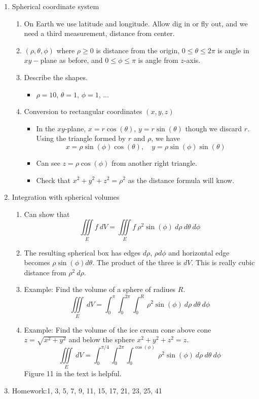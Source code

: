 \documentclass{article}
\begin{document}
\begin{enumerate}
\item Spherical coordinate system
\begin{enumerate}
\item On Earth we use latitude and longitude. Allow dig in or fly out, and we need a third measurement, distance from center.
\item $(\rho, \theta, \phi)$ where $\rho \geq 0$ is distance from the origin, $0 \leq \theta \leq 2\pi$ is angle in $xy-$plane as before, and $0 \leq \phi \leq \pi$ is angle from $z$-axis.
\item Describe the shapes.
\begin{itemize}
\item $\rho = 10$, $\theta = 1$, $\phi = 1$, ...
\end{itemize}
\item Conversion to rectangular coordinates $(x,y,z)$
\begin{itemize}
\item In the $xy$-plane, $x=r\cos(\theta)$, $y=r\sin(\theta)$ though we discard $r$. Using the triangle formed by $r$ and $\rho$, we have
\[
x = \rho \sin(\phi) \cos(\theta), \quad y = \rho \sin(\phi) \sin(\theta)
\]
\item Can see $z = \rho \cos(\phi)$ from another right triangle.
\item Check that $x^2+y^2+z^2 = \rho^2$ as the distance formula will know.
\end{itemize}
\end{enumerate}

\item Integration with spherical volumes
\begin{enumerate}
\item Can show that
\[
\iiint\limits_E f ~dV = \iiint\limits_E f ~\rho^2 \sin(\phi) ~d\rho ~d\theta ~d\phi
\]
\item The resulting spherical box has edges $d\rho$, $\rho d\phi$ and horizontal edge becomes $\rho \sin(\phi) d\theta$. The product of the three is $dV$. This is really cubic distance from $\rho^2 ~d\rho$.
\item Example: Find the volume of a sphere of radiues $R$.
\[
\iiint\limits_E ~dV = \int_0^{\pi} \int_0^{2\pi} \int_0^R ~\rho^2 \sin(\phi) ~d\rho ~d\theta ~d\phi
\]
\item Example: Find the volume of the ice cream cone above cone $z=\sqrt{x^2+y^2}$ and below the sphere $x^2+y^2+z^2=z$. 
\[
\iiint\limits_E ~dV = \int_0^{\pi/4} \int_0^{2\pi} \int_0^{\cos(\phi)} ~\rho^2 \sin(\phi) ~d\rho ~d\theta ~d\phi
\]
Figure 11 in the text is helpful.
\end{enumerate}


\item Homework:1, 3, 5, 7, 9, 11, 15, 17, 21, 23, 25, 41

\end{enumerate}
\end{document}
